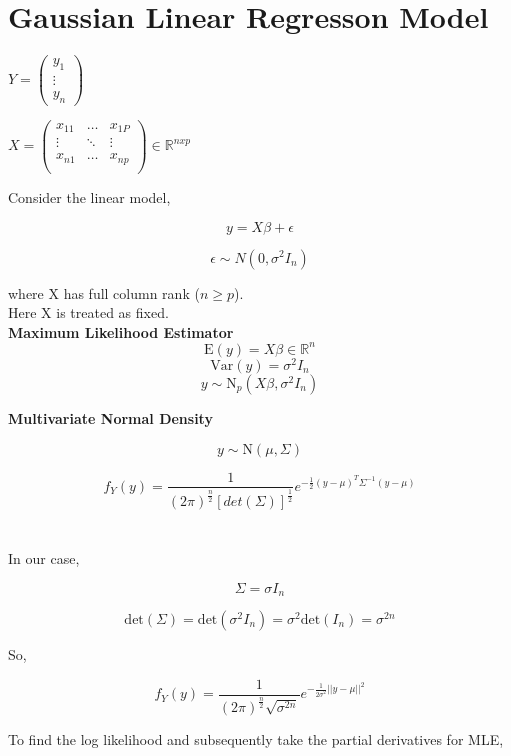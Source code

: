 \documentclass[11pt,fleqn]{book} %
\begin{document}
\section{Gaussian Linear Regresson Model}

$Y =
\begin{pmatrix} y_1  \\  
\vdots \\
y_n
 \end{pmatrix}$

$X = \begin{pmatrix}
	x_{11} & \dots & x_{1P} \\
	\vdots & \ddots & \vdots\\
	x_{n1} & \dots & x_{np}\\
\end{pmatrix} \in \mathbb{R}^{n x p}$

\vspace{5mm}

Consider the linear model, 

$$y = X\beta  + \epsilon$$

$$\epsilon \sim N(0, \sigma^2 I_n) $$

where X has full column rank ($n \geq p$).\\

Here X is treated as fixed. \\

\textbf{Maximum Likelihood Estimator} 
		$$\text{E}(y) = X\beta \in \mathbb{R}^n $$
		$$\text{Var}(y) = \sigma^2 I_n $$
	    $$y \sim \text{N}_p(X\beta, \sigma^2 I_n)$$


\textbf{Multivariate Normal Density}

$$y \sim \text{N}(\mu, \Sigma) $$

$$f_Y(y) = \frac{1}{(2\pi)^{\frac{n}{2}} [det(\Sigma)]^{\frac{1}{2}}} e^{-\frac{1}{2} (y - \mu)^T \Sigma^{- 1} (y - \mu)}$$\\
\\
In our case, 

$$\Sigma = \sigma I_n $$

$$\text{det}(\Sigma) = \text{det}(\sigma^2 I_n) = \sigma^2 \text{det}( I_n) = \sigma^{2n} $$

So, 

$$f_Y(y) = \frac{1}{(2\pi)^{\frac{n}{2}} \sqrt{\sigma^{2n}}} e^{-\frac{1}{2\sigma^2} ||y - \mu ||^2}$$

\vspace{5mm}

To find the log likelihood and subsequently take the partial derivatives for MLE,  \\
\end{document}
